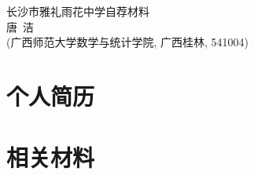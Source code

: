 \documentclass[UFT8]{ctexart}%
\begin{document}
\thispagestyle{empty} %
\vspace*{3cm}
\begin{center}
{{\LARGE\heiti 长沙市雅礼雨花中学自荐材料}\\[0.6cm]
{\normalsize 唐\ 洁}\\[0.1cm]
{\small(广西师范大学数学与统计学院, 广西桂林, 541004)}}
\end{center}

\clearpage%
\tableofcontents%
\thispagestyle{empty} %

\clearpage%
\setcounter{page}{1}%

%
%
%
%
%
%

\section{个人简历}
%
%


\section{相关材料}
\end{document}
